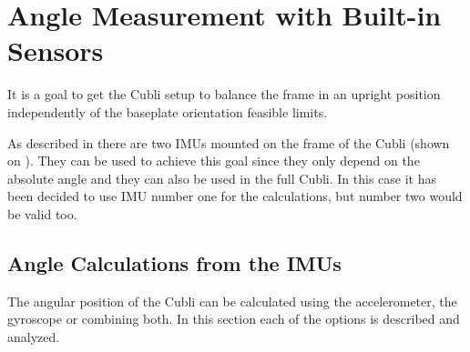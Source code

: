 \chapter{Angle Measurement with Built-in Sensors}\label{chap:CompFilter}
It is a goal to get the Cubli setup to balance the frame in an upright position independently of the baseplate orientation feasible limits.

As described in  there are two IMUs mounted on the frame of the Cubli (shown on ). They can be used to achieve this goal since they only depend on the absolute angle and they can also be used in the full Cubli. In this case it has been decided to use IMU number one for the calculations, but number two would be valid too.

\section{Angle Calculations from the IMUs}
The angular position of the Cubli can be calculated using the accelerometer, the gyroscope or combining both. In this section each of the options is described and analyzed.

